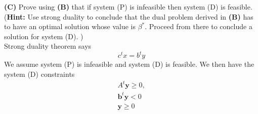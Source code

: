 \documentclass[11pt]{article}
\begin{document}
\medskip

\noindent\textbf{(C)} Prove using \textbf{(B)}  that if system 
\textsf{(P)} is infeasible then system \textsf{(D)} is feasible. (\textbf{Hint:} Use
strong duality to conclude that the dual problem derived in 
\textbf{(B)} has to have an optimal solution whose value
is $\beta^*$. Proceed from there to conclude a solution for system 
(D). )
\\
Strong duality theorem says
\[
c^tx = b^ty
\]
We assume system (P) is infeasible and system (D) is feasible.  We then have the system (D) constraints
\[ \begin{array}{l}
A^t \mathbf{y} \geq 0,\\
\mathbf{b}^t \mathbf{y} < 0\\
\mathbf{y} \geq 0 \\
\end{array}\]
\end{document}
